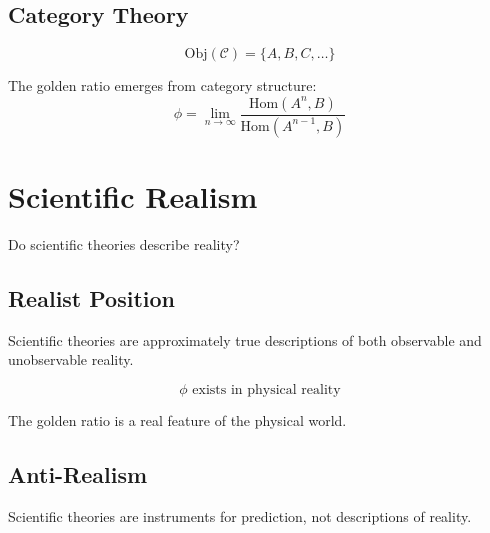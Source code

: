 \subsection{Category Theory}

\begin{equation}
\text{Obj}(\mathcal{C}) = \{A, B, C, \ldots\}
\end{equation}

\begin{proposition}
\label{prop:golden-cat}
The golden ratio emerges from category structure:
\begin{equation}
\phi = \lim_{n\to\infty} \frac{\text{Hom}(A^n, B)}{\text{Hom}(A^{n-1}, B)}
\end{equation}

\end{proposition}

\section{Scientific Realism}

Do scientific theories describe reality?

\subsection{Realist Position}

\begin{definition}
\label{def:realism}
Scientific theories are approximately true descriptions of both observable and unobservable reality.
\end{definition}

\begin{theorem}
\label{thm:realist-golden}
\begin{equation}
\phi \text{ exists in physical reality}
\end{equation}

The golden ratio is a real feature of the physical world.
\end{theorem}

\subsection{Anti-Realism}

\begin{definition}
\label{def:antirealism}
Scientific theories are instruments for prediction, not descriptions of reality.
\end{definition}

